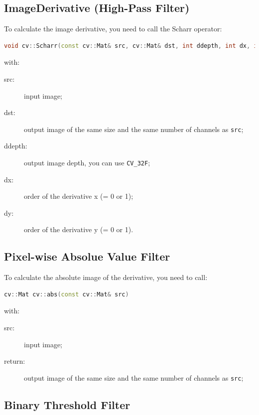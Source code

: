 \documentclass[english,a4paper,12pt,oneside]{article}
\begin{document}
\subsection{ImageDerivative (High-Pass Filter)}
To calculate the image derivative, you need to call the Scharr operator:
 \begin{lstlisting}[language=c++]
 void cv::Scharr(const cv::Mat& src, cv::Mat& dst, int ddepth, int dx, int dy)
\end{lstlisting}
with:
\begin{description}
 \item[src:] input image;
 \item[dst:] output image of the same size and the same number of channels as \verb+src+;
 \item[ddepth:] output image depth, you can use \verb+CV_32F+;
 \item[dx:] order of the derivative x (= 0 or 1);
 \item[dy:] order of the derivative y (= 0 or 1).
\end{description}

\subsection{Pixel-wise Absolue Value Filter}
To calculate the absolute image of the derivative, you need to call:
 \begin{lstlisting}[language=c++]
 cv::Mat cv::abs(const cv::Mat& src)
\end{lstlisting}
with:
\begin{description}
 \item[src:] input image;
 \item[return:] output image of the same size and the same number of channels as \verb+src+;
\end{description}


\subsection{Binary Threshold Filter}
\end{document}
